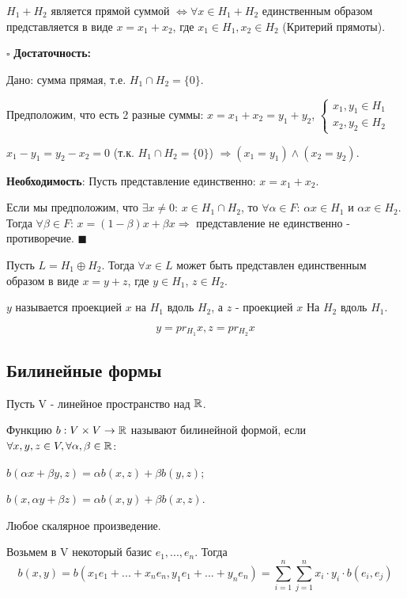 \documentclass[../main.tex]{subfiles}
\begin{document}
\void{} $H_1 + H_2$ является прямой суммой $\Longleftrightarrow \forall x\in H_1+H_2$
единственным образом представляется в виде $x = x_1+x_2$, где $x_1\in H_1, x_2\in H_2$ (Критерий прямоты).

\void $\square$ \textbf{Достаточность:}

Дано: сумма прямая, т.е. $H_1\cap H_2 = \{0\}$.

Предположим, что есть 2 разные суммы: $x = x_1+x_2 = y_1+y_2$, $\left\{ \begin{matrix}x_1,y_1\in H_1\\ x_2,y_2\in H_2\end{matrix}\right.$

$x_1 - y_1 = y_2 - x_2 = 0$ (т.к. $H_1\cap H_2 = \{0\}$) $\Longrightarrow (x_1 = y_1) \wedge (x_2 = y_2)$.

\textbf{Необходимость}: Пусть представление единственно: $x = x_1+x_2$.

Если мы предположим, что $\exists x\neq 0$: $x\in H_1\cap H_2$, то
$\forall\alpha\in F$: $\alpha x\in H_1$ и $\alpha x\in H_2$. Тогда
$\forall\beta\in F$: $x = (1-\beta)x + \beta x \Longrightarrow$ представление не единственно - противоречие.
$\blacksquare$

\void
Пусть $L = H_1\oplus H_2$. Тогда $\forall x\in L$ может быть представлен единственным образом в виде
$x = y + z$, где $y\in H_1$, $z\in H_2$. 

\void{} $y$ называется проекцией $x$ на $H_1$ вдоль $H_2$, а $z$ - проекцией $x$ На
$H_2$ вдоль $H_1$.

$$y = pr_{H_1}x, z = pr_{H_2}x$$

\subsection{Билинейные формы}

Пусть V - линейное пространство над $\mathbb{R}$.

\void{} Функцию $b: V\times V \rightarrow \mathbb{R}$ называют билинейной формой, если $\forall x,y,z\in V, \forall\alpha,\beta\in\mathbb{R}$:

\void{} $b(\alpha x + \beta y, z) = \alpha b(x, z) + \beta b(y, z)$;

\void{} $b(x, \alpha y + \beta z) = \alpha b(x, y) + \beta b(x, z)$.

\void{} Любое скалярное произведение.

\void
Возьмем в V некоторый базис $e_1,...,e_n$. Тогда 
$$b(x,y) = b(x_1e_1 + ... + x_n e_n, y_1e_1 + ... + y_n e_n) = \sum_{i=1}^n\sum_{j=1}^n x_i\cdot y_i\cdot b(e_i,e_j)$$
\end{document}
